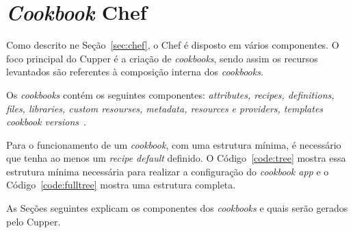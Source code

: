 \section{\textit{Cookbook} Chef}
\label{sec:lev-rec}

Como descrito ne Seção~\ref{sec:chef}, o Chef é disposto em vários
componentes. O foco principal do Cupper é a criação de \textit{cookbooks},
sendo assim os recursos levantados são referentes à composição interna
dos \textit{cookbooks}.

Os \textit{cookbooks} contém os seguintes componentes: \textit{attributes, recipes, definitions,
files, libraries, custom resourses, metadata, resources e providers, templates
cookbook versions}~\cite{chefdoc:2016}.

Para o funcionamento de um \textit{cookbook}, com uma estrutura mínima, é necessário que tenha
ao menos um \textit{recipe default} definido. O Código~\ref{code:tree} mostra essa
estrutura mínima necessária para realizar a configuração do \textit{cookbook app} e o Código~\ref{code:fulltree} mostra uma estrutura completa.

\noindent\begin{minipage}{.45\textwidth}
  
\end{minipage}\hfill
\noindent\begin{minipage}{.45\textwidth}
  
\end{minipage}

As Seções seguintes explicam os componentes dos \textit{cookbooks} e quais serão gerados
pelo Cupper.

%

%

%
%
%

%
